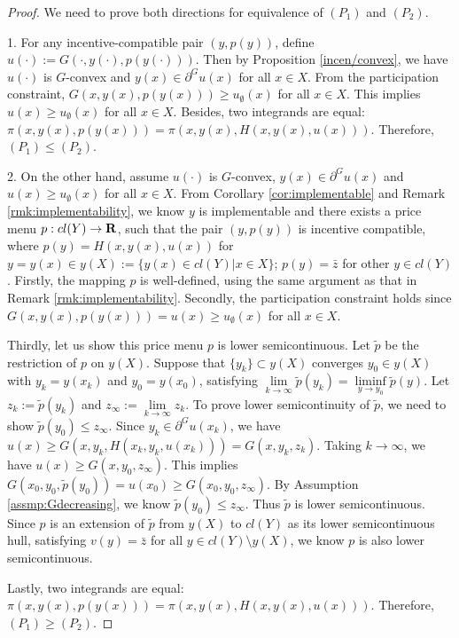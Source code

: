 \begin{proof} %
	
	We need to prove both directions for equivalence of $(P_1)$ and $(P_2)$.
	
	1. For any incentive-compatible pair $(y, p(y))$, define $u(\cdot) := G(\cdot,y(\cdot), p(y(\cdot)))$. Then by Proposition \ref{incen/convex}, we have $u(\cdot)$ is $G$-convex and $y(x) \in \partial^G u(x)$ for all $x \in X$. From the participation constraint, $G(x, y(x), p(y(x))) \ge u_{\emptyset}(x)$ for all $x\in X$. This implies $u(x)\ge u_{\emptyset}(x)$ for all $x\in X$. Besides, two integrands are equal: $\pi(x, y(x), p(y(x))) = \pi(x,y(x), H(x,y(x), u(x)))$. Therefore, $(P_1) \le (P_2)$.
	
	2. On the other hand, assume $u(\cdot)$ is $G$-convex, $y(x)\in \partial^G u(x)$ and $u(x) \ge u_{\emptyset}(x)$ for all $x \in X$. From Corollary \ref{cor:implementable} and Remark \ref{rmk:implementability}, we know $y$ is implementable and there exists a price menu $p: cl(Y) \rightarrow {\mathbf R}$, such that the pair $(y, p(y))$ is incentive compatible, where $p(y) = H(x,y(x), u(x))$ for $y = y(x) \in y(X) :=\{ y(x) \in cl(Y) | x \in X \}$; $p(y) = \bar{z}$ for other $y\in cl(Y)$. Firstly, the mapping $p$ is well-defined, using the same argument as that in Remark \ref{rmk:implementability}. %
	Secondly, the participation constraint holds since $G(x,y(x), p(y(x))) = u(x) \ge u_{\emptyset}(x)$ for all $x\in X$. 
	
	Thirdly, let us show this price menu $p$ is lower semicontinuous. Let $\tilde{p}$ be the restriction of $p$ on $y(X)$. Suppose that $\{y_k \} \subset y(X)$ converges $y_0 \in y(X)$ with $y_k = y(x_k)$ and $y_0 = y(x_0)$, satisfying $\lim\limits_{k \rightarrow \infty} \tilde{p}(y_k) = \liminf\limits_{y \rightarrow y_{0}} \tilde{p}(y)$.  Let $z_{k}:= \tilde{p}(y_k)$ and $z_{\infty}:=\lim\limits_{k \rightarrow \infty} z_k$. To prove lower semicontinuity of $\tilde{p}$, we need to show $\tilde{p}(y_0)\le z_{\infty}$.  Since $y_k \in \partial^G u(x_k)$, we have $u(x) \ge G(x,y_k, H(x_k, y_k, u(x_k))) = G(x, y_k, z_k)$. Taking $k\rightarrow \infty$, we have $u(x)\ge G(x, y_0, z_{\infty})$. This implies $G(x_0, y_0, \tilde{p}(y_0)) = u(x_0) \ge G(x_0, y_0, z_{\infty})$. By Assumption \ref{assmp:Gdecreasing}, we know $\tilde{p}(y_0) \le z_{\infty}$. Thus $\tilde{p}$ is lower semicontinuous. Since $p$ is an extension of $\tilde{p}$ from $y(X)$ to $cl(Y)$ as its lower semicontinuous hull, satisfying $v(y)= \bar{z}$ for all $y\in cl(Y)\setminus y(X)$, we know $p$ is also lower semicontinuous.
	
	Lastly, two integrands are equal: $\pi(x, y(x), p(y(x))) = \pi(x,y(x), H(x,y(x), u(x)))$. Therefore, $(P_1) \ge (P_2)$.
\end{proof}

